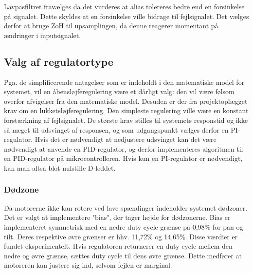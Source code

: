 Lavpasfiltret fravælges da det vurderes at alias tolereres bedre end en forsinkelse på signalet. Dette skyldes at en forsinkelse ville bidrage til fejlsignalet. 
Det vælges derfor at bruge ZoH til upsamplingen, da denne reagerer momentant på ændringer i inputsignalet. 


\subsection{Valg af regulatortype}
\label{ss:ValgReg}
Pga. de simplificerende antagelser som er indeholdt i den matematiske model for systemet,
vil en åbensløjferegulering være et dårligt valg: den vil være følsom overfor afvigelser fra den
matematiske model. Desuden er der fra projektoplægget krav om en lukketsløjferegulering.
Den simpleste regulering ville være en konstant forstærkning af fejlsignalet.
De største krav stilles til systemets responstid og ikke så meget til udsvinget af responsen,
og som udgangspunkt vælges derfor en PI-regulator.
Hvis det er nødvendigt at nedjustere udsvinget kan det være nødvendigt at anvende en PID-regulator,
og derfor implementeres algoritmen til en PID-regulator på mikrocontrolleren.
Hvis kun en PI-regulator er nødvendigt, kan man altså blot nulstille D-leddet.

\subsubsection{Dødzone}
Da motorerne ikke kan rotere ved lave spændinger indeholder systemet dødzoner.
Det er valgt at implementere "bias", der tager højde for dødzonerne.
Bias er implementeret symmetrisk med en nedre duty cycle grænse på 0,98\% for pan og tilt.
Deres respektive øvre grænser er hhv. 11,72\% og 14,65\%.
Disse værdier er fundet eksperimentelt.
Hvis regulatoren returnerer en duty cycle mellem den nedre og øvre grænse, sættes duty cycle til dens øvre grænse.
Dette medfører at motoreren kan justere sig ind, selvom fejlen er marginal.

